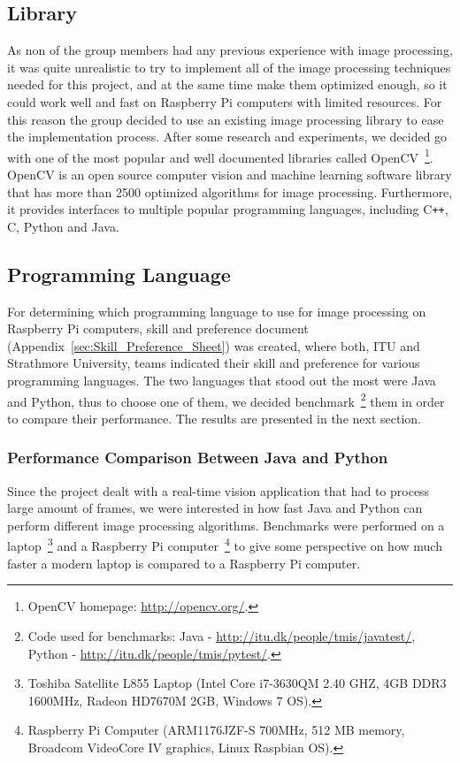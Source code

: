 
\subsection{Library}
As non of the group members had any previous experience with image processing, it was quite unrealistic to try to implement all of the image processing techniques needed for this project, and at the same time make them optimized enough, so it could work well and fast on Raspberry Pi computers with limited resources. For this reason the group decided to use an existing image processing library to ease the implementation process. After some research and experiments, we decided go with one of the most popular and well documented libraries called OpenCV~\footnote{OpenCV homepage: \url{http://opencv.org/}.}. OpenCV is an open source computer vision and machine learning software library that has more than 2500 optimized algorithms for image processing. Furthermore, it provides interfaces to multiple popular programming languages, including C\texttt{++}, C, Python and Java.

\subsection{Programming Language}
For determining which programming language to use for image processing on Raspberry Pi computers, skill and preference document (Appendix~\ref{sec:Skill_Preference_Sheet}) was created, where both, ITU and Strathmore University, teams indicated their skill and preference for various programming languages. The two languages that stood out the most were Java and Python, thus to choose one of them, we decided benchmark~\footnote{Code used for benchmarks: Java - \url{http://itu.dk/people/tmis/javatest/}, Python - \url{http://itu.dk/people/tmis/pytest/}.} them in order to compare their performance. The results are presented in the next section.

\subsubsection{Performance Comparison Between Java and Python}
Since the project dealt with a real-time vision application that had to process large amount of frames, we were interested in how fast Java and Python can perform different image processing algorithms. Benchmarks were performed on a laptop~\footnote{Toshiba Satellite L855 Laptop (Intel Core i7-3630QM 2.40 GHZ, 4GB DDR3 1600MHz, Radeon HD7670M 2GB, Windows 7 OS).} and a Raspberry Pi computer~\footnote{Raspberry Pi Computer (ARM1176JZF-S 700MHz, 512 MB memory, Broadcom VideoCore IV graphics, Linux Raspbian OS).} to give some perspective on how much faster a modern laptop is compared to a Raspberry Pi computer.

